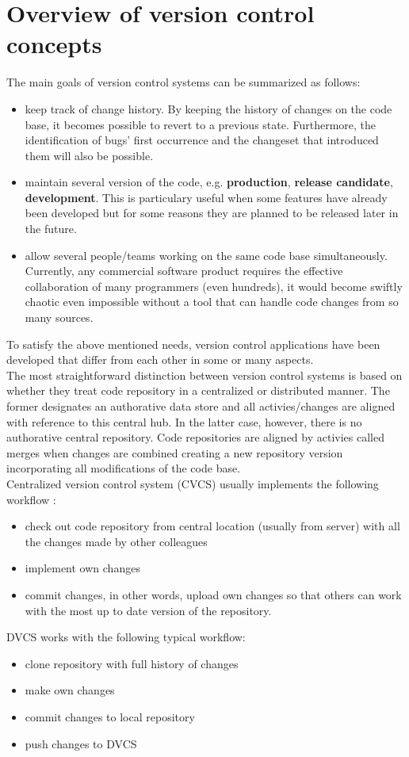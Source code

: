 \section{Overview of version control concepts} \label{overview-version-control}
The main goals of version control systems can be summarized as follows:
\begin{itemize}
    \item keep track of change history. By keeping the history of changes on the code base, it becomes possible to revert
    to a previous state. Furthermore, the identification of bugs' first occurrence and the changeset that introduced them
    will also be possible.
    \item maintain several version of the code, e.g. \textbf{production}, \textbf{release candidate}, \textbf{development}. 
    This is particulary useful when some features have already been developed but for some reasons they are planned to be 
    released later in the future.
    \item allow several people/teams working on the same code base simultaneously. Currently, any commercial software
    product requires the effective collaboration of many programmers (even hundreds), it would become swiftly chaotic
    even impossible without a tool that can handle code changes from so many sources.
\end{itemize}
To satisfy the above mentioned needs, version control applications have been developed that differ from each other in
some or many aspects. \\
The most straightforward distinction between version control systems is based on whether they treat code repository in 
a centralized or distributed manner. The former designates an authorative data store and all activies/changes are 
aligned with reference to this central hub. In the latter case, however, there is no authorative central repository.
Code repositories are aligned by activies called merges when changes are combined creating a new repository version 
incorporating all modifications of the code base. \\
Centralized version control system (CVCS) usually implements the following workflow \cite{atlass}:
\begin{itemize}
    \item check out code repository from central location (usually from server) with all the changes made by other
    colleagues
    \item implement own changes
    \item commit changes, in other words, upload own changes so that others can work with the most up to date version of
    the repository.
\end{itemize}
DVCS works with the following typical workflow:
\begin{itemize}
    \item clone repository with full history of changes
    \item make own changes
    \item commit changes to local repository
    \item push changes to DVCS
\end{itemize}
